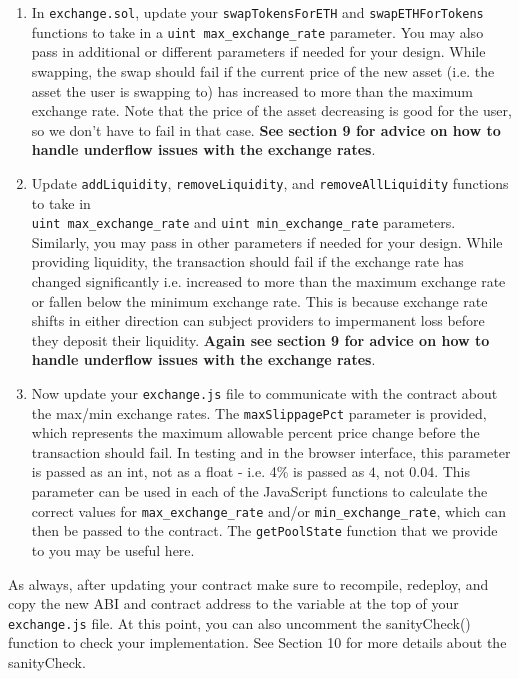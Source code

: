 \documentclass[11pt]{article}
\begin{document}
\begin{enumerate}
    \item In \texttt{exchange.sol}, update your \texttt{swapTokensForETH} and \texttt{swapETHForTokens} functions to take in a \texttt{uint max\_exchange\_rate} parameter. You may also pass in additional or different parameters if needed for your design. While swapping, the swap should fail if the current price of the new asset (i.e. the asset the user is swapping to) has increased to more than the maximum exchange rate. Note that the price of the asset decreasing is good for the user, so we don't have to fail in that case. \textbf{See section 9 for advice on how to handle underflow issues with the exchange rates}.
    \item Update \texttt{addLiquidity}, \texttt{removeLiquidity}, and \texttt{removeAllLiquidity} functions to take in \\
    \texttt{uint max\_exchange\_rate} and \texttt{uint min\_exchange\_rate} parameters. Similarly, you may pass in other parameters if needed for your design. While providing liquidity, the transaction should fail if the exchange rate has changed significantly i.e. increased to more than the maximum exchange rate or fallen below the minimum exchange rate. This is because exchange rate shifts in either direction can subject providers to impermanent loss before they deposit their liquidity. \textbf{Again see section 9 for advice on how to handle underflow issues with the exchange rates}.
    \item Now update your \texttt{exchange.js} file to communicate with the contract about the max/min exchange rates. The \texttt{maxSlippagePct} parameter is provided, which represents the maximum allowable percent price change before the transaction should fail. In testing and in the browser interface, this parameter is passed as an int, not as a float - i.e. 4\% is passed as $4$, not $0.04$. This parameter can be used in each of the JavaScript functions to calculate the correct values for \texttt{max\_exchange\_rate} and/or \texttt{min\_exchange\_rate}, which can then be passed to the contract. The \texttt{getPoolState} function that we provide to you may be useful here.
\end{enumerate}

As always, after updating your contract make sure to recompile, redeploy, and copy the new ABI and contract address to the variable at the top of your \texttt{exchange.js} file. At this point, you can also uncomment the sanityCheck() function to check your implementation. See Section 10 for more details about the sanityCheck. 
\end{document}

